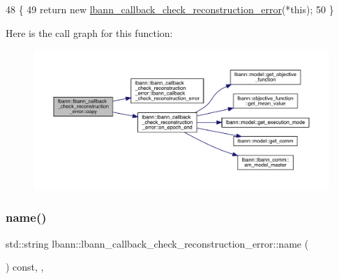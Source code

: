 \begin{DoxyCode}
48                                                                    \{
49     \textcolor{keywordflow}{return} \textcolor{keyword}{new} \hyperlink{classlbann_1_1lbann__callback__check__reconstruction__error_aaed51def6fe5ba7093e3d2cc41637a2a}{lbann\_callback\_check\_reconstruction\_error}(*\textcolor{keyword}{this});
50   \}
\end{DoxyCode}
Here is the call graph for this function\+:\nopagebreak
\begin{figure}[H]
\begin{center}
\leavevmode
\includegraphics[width=350pt]{classlbann_1_1lbann__callback__check__reconstruction__error_a7c2367fdebae1798c6cbf2846c7492a3_cgraph}
\end{center}
\end{figure}
\mbox{\label{classlbann_1_1lbann__callback__check__reconstruction__error_a604bb361e11774cb5d047d65a5d6508e}} 
\subsubsection{\texorpdfstring{name()}{name()}}
{\footnotesize\ttfamily std\+::string lbann\+::lbann\+\_\+callback\+\_\+check\+\_\+reconstruction\+\_\+error\+::name (\begin{DoxyParamCaption}{ }\end{DoxyParamCaption}) const\hspace{0.3cm}{\ttfamily [inline]}, {\ttfamily [override]}, {\ttfamily [virtual]}}

